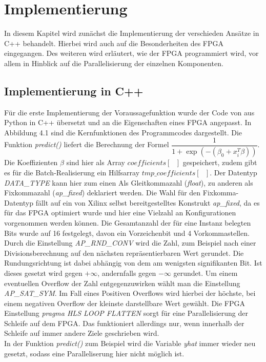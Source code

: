 \chapter{Implementierung}
In diesem Kapitel wird zunächst die Implementierung der verschieden Ansätze in C++ behandelt. Hierbei wird auch auf die Besonderheiten des FPGA eingegangen. Des weiteren wird erläutert, wie der FPGA programmiert wird, vor allem in Hinblick auf die Parallelisierung der einzelnen Komponenten.
\section{Implementierung in C++}
Für die erste Implementierung der Voraussagefunktion wurde der Code von \cite{IMPL} aus Python in C++ übersetzt und an die Eigenschaften eines FPGA angepasst. In Abbildung 4.1 sind die Kernfunktionen des Programmcodes dargestellt. Die Funktion \textit{predict()} liefert die Berechnung der Formel $\dfrac{1}{1+\exp(-(\beta_0+x_i^T\beta))}$. Die Koeffizienten $\beta$ sind hier als Array $coefficients[\text{ }]$ gespeichert, zudem gibt es für die Batch-Realisierung ein Hilfsarray $tmp\textit{\_}coefficients[\text{ }]$. Der Datentyp \textit{DATA\_TYPE} kann hier zum einen Als Gleitkommazahl (\textit{float}), zu anderen als Fixkommazahl (\textit{ap\_fixed}) deklariert werden. Die Wahl für den Fixkomma-Datentyp fällt auf ein von Xilinx selbst bereitgestelltes Konstrukt \textit{ap\_fixed}, da es für das FPGA optimiert wurde und hier eine Vielzahl an Konfigurationen vorgenommen werden können. Die Gesamtanzahl der für eine Instanz belegten Bits wurde auf 16 festgelegt, davon ein Vorzeichenbit und 4 Vorkommastellen. Durch die Einstellung \textit{AP\_RND\_CONV} wird die Zahl, zum Beispiel nach einer Divisionsberechnung auf den nächsten repräsentierbaren Wert gerundet. Die Rundungsrichtung ist dabei abhängig von dem am wenigsten signifikanten Bit. Ist dieses gesetzt wird gegen $+\infty$, andernfalls gegen $-\infty$ gerundet.\cite{XIL2}
Um einem eventuellen Overflow der Zahl entgegenzuwirken wählt man die Einstellung \textit{AP\_SAT\_SYM}. Im Fall eines Positiven Overflows wird hierbei der höchste, bei einem negativen Overflow der kleinste darstellbare Wert gewählt.\cite{XIL2} Die FPGA Einstellung \textit{pragma HLS LOOP FLATTEN} sorgt für eine Parallelisierung der Schleife auf dem FPGA. Das funktioniert allerdings nur, wenn innerhalb der Schleife auf immer andere Ziele geschrieben wird.\\ In der Funktion \textit{predict()} zum Beispiel wird die Variable \textit{yhat} immer wieder neu gesetzt, sodass eine Paralleliserung hier nicht möglich ist. 
